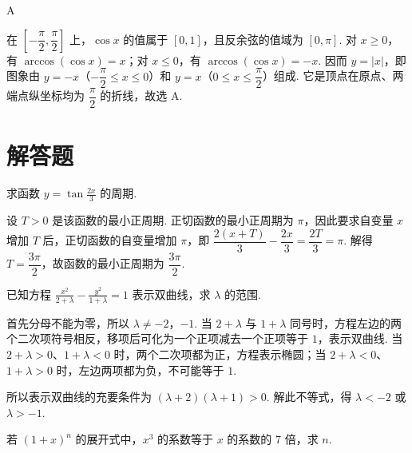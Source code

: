 \documentclass[UTF8,a4paper,oneside,11pt]{ctexbook}
\begin{document}
\begin{answer}
A
\end{answer}

\begin{solution}
在 \(\left[-\dfrac{\pi}{2},\dfrac{\pi}{2}\right]\) 上，\(\cos x\) 的值属于 \([0,1]\)，且反余弦的值域为 \([0,\pi]\). 对 \(x\geqslant0\)，有 \(\arccos(\cos x)=x\)；对 \(x\leqslant0\)，有 \(\arccos(\cos x)=-x\). 因而
\(y=\left|x\right|\)，即图象由 \(y=-x\)（\(-\dfrac{\pi}{2}\leq x\leqslant0\)）和 \(y=x\)（\(0\leq x\leq\dfrac{\pi}{2}\)）组成. 它是顶点在原点、两端点纵坐标均为 \(\dfrac{\pi}{2}\) 的折线，故选 A.
\end{solution}

\section{解答题}

\begin{problem}

求函数 \(y = \tan \frac{2x}{3}\) 的周期.
\end{problem}

\begin{solution}
设 \(T>0\) 是该函数的最小正周期. 正切函数的最小正周期为 \(\pi\)，因此要求自变量 \(x\) 增加 \(T\) 后，正切函数的自变量增加 \(\pi\)，即
\(\dfrac{2(x+T)}{3}-\dfrac{2x}{3}=\dfrac{2T}{3}=\pi\). 解得 \(T=\dfrac{3\pi}{2}\)，故函数的最小正周期为 \(\dfrac{3\pi}{2}\).
\end{solution}

\begin{problem}

已知方程 \(\frac{x^2}{2 + \lambda} - \frac{y^2}{1 + \lambda} = 1\) 表示双曲线，求 \(\lambda\) 的范围.
\end{problem}

\begin{solution}
首先分母不能为零，所以 \(\lambda\ne-2\)，\(-1\). 当 \(2+\lambda\) 与 \(1+\lambda\) 同号时，方程左边的两个二次项符号相反，移项后可化为一个正项减去一个正项等于 \(1\)，表示双曲线. 当 \(2+\lambda>0\)、\(1+\lambda<0\) 时，两个二次项都为正，方程表示椭圆；当 \(2+\lambda<0\)、\(1+\lambda>0\) 时，左边两项都为负，不可能等于 \(1\).

所以表示双曲线的充要条件为
\((\lambda+2)(\lambda+1)>0\). 解此不等式，得 \(\lambda<-2\) 或 \(\lambda>-1\).
\end{solution}

\begin{problem}

若 \(\left(1 + x\right)^n\) 的展开式中，\(x^3\) 的系数等于 \(x\) 的系数的 7 倍，求 \(n\).
\end{problem}
\end{document}
